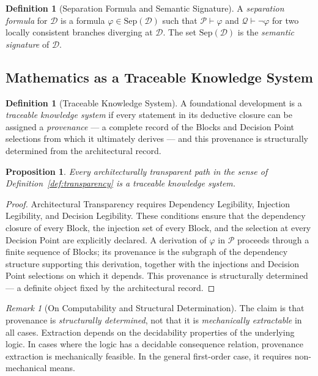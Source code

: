 \documentclass[12pt, a4paper]{article}
\theoremstyle{plain}
\newtheorem{proposition}[theorem]{Proposition}
\theoremstyle{definition}
\newtheorem{definition}[theorem]{Definition}
\theoremstyle{remark}
\newtheorem{remark}[theorem]{Remark}
\newcommand{\Sep}[1]{\mathrm{Sep}(#1)}
\begin{document}
\begin{definition}[Separation Formula and Semantic Signature]
\label{def:separation}
A \emph{separation formula} for $\mathcal{D}$ is a formula
$\varphi \in \Sep{\mathcal{D}}$ such that
$\mathcal{P} \vdash \varphi$ and $\mathcal{Q} \vdash \neg\varphi$ for
two locally consistent branches diverging at $\mathcal{D}$. The set
$\Sep{\mathcal{D}}$ is the \emph{semantic signature} of $\mathcal{D}$.
\end{definition}

\subsection{Mathematics as a Traceable Knowledge System}
\label{subsec:traceable}

\begin{definition}[Traceable Knowledge System]
\label{def:traceable}
A foundational development is a \emph{traceable knowledge system} if
every statement in its deductive closure can be assigned a
\emph{provenance} --- a complete record of the Blocks and Decision
Point selections from which it ultimately derives --- and this
provenance is structurally determined from the architectural record.
\end{definition}

\begin{proposition}
\label{prop:traceable}
Every architecturally transparent path in the sense of
Definition~\ref{def:transparency} is a traceable knowledge system.
\end{proposition}

\begin{proof}
Architectural Transparency requires Dependency Legibility, Injection
Legibility, and Decision Legibility. These conditions ensure that
the dependency closure of every Block, the injection set of every
Block, and the selection at every Decision Point are explicitly
declared. A derivation of $\varphi$ in $\mathcal{P}$ proceeds through
a finite sequence of Blocks; its provenance is the subgraph of the
dependency structure supporting this derivation, together with the
injections and Decision Point selections on which it depends. This
provenance is structurally determined --- a definite object fixed by
the architectural record.
\end{proof}

\begin{remark}[On Computability and Structural Determination]
\label{rem:computability-provenance}
The claim is that provenance is \emph{structurally determined}, not
that it is \emph{mechanically extractable} in all cases. Extraction
depends on the decidability properties of the underlying logic. In
cases where the logic has a decidable consequence relation, provenance
extraction is mechanically feasible. In the general first-order case,
it requires non-mechanical means.
\end{remark}
\end{document}
